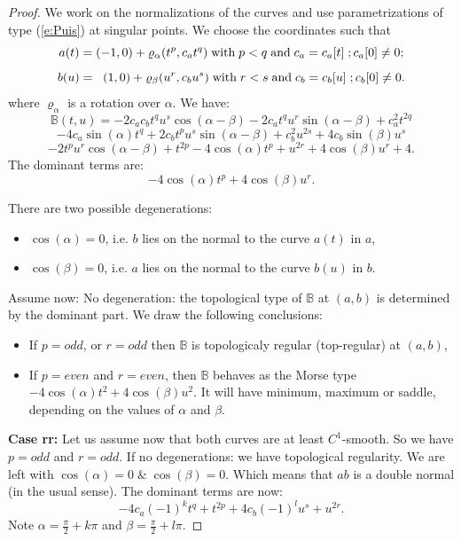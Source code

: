 \documentclass[10pt,a4paper]{amsart}
\begin{document}
\begin{proof}
We work on the normalizations of the curves and use parametrizations of type (\ref{e:Puis}) at singular points. 
We choose the coordinates such that
$$ a(t) = (-1,0) +\varrho_{\alpha}(t^p, c_a t^q)   \;  \mbox{\rm with} \;  p <q  \;  \mbox{\rm and}\;  c_a = c_a[t] \; ; c_a[0] \ne 0  ;$$
$$ b(u) =\;  \; (1,0) + \varrho_{\beta} (u^r, c_b u^s)  \;  \mbox{\rm with} \;  r <s  \;  \mbox{\rm and}\;  c_b = c_b[u]\; ; c_b[0] \ne 0. $$
where $\varrho_{\alpha}$ is a rotation over $\alpha$. We have:
$$\mathbb{B} (t,u) =
-2 c_a c_b t^q u^s \cos (\alpha -\beta )-2 c_a t^q u^r \sin (\alpha -\beta )+c_a^2 t^{2 q}$$ $$-4 c_a \sin (\alpha ) t^q +2 c_b t^p u^s \sin (\alpha -\beta )+c_b^2 u^{2 s}+4 c_b \sin (\beta ) u^s$$ $$ - 2 t^p u^r \cos (\alpha -\beta )+t^{2 p} -4 \cos (\alpha ) t^p +u^{2 r}+4 \cos (\beta ) u^r+4.
$$
The dominant terms are:
\begin{equation}\label{dominant}
-4 \cos (\alpha ) t^p +4 \cos (\beta ) u^r.
 \end{equation}


There are two possible degenerations:
\begin{itemize}
\item $\cos (\alpha )= 0$, i.e.  $b$ lies on the normal to the curve $a(t)$ in $a$,
\item $\cos (\beta) = 0$, i.e. $a$ lies on the normal to the curve $b(u)$ in $b$.
\end{itemize}


Assume now: No degeneration:  the topological type of $\mathbb{B}$  at $(a,b)$ is determined by the dominant part.
We draw the following conclusions:
\begin{itemize}
\item If $p = odd$, or $r= odd$ then $\mathbb{B}$ is topologicaly regular (top-regular) at $(a,b)$,
\item If $p = even$ and $r = even$,
 then $\mathbb{B}$ behaves as  the Morse type $ -4 \cos (\alpha ) t^2 +4 \cos (\beta ) u^2$.
 It will have minimum, maximum or saddle, depending on the values of $\alpha$ and $\beta$.
\end{itemize}

{\bf Case rr:} Let us assume now that both curves are at least $C^1$-smooth. So we have $p=odd$ and $r=odd$.
If no degenerations: we have topological regularity. We are left with $\cos (\alpha) = 0 \;  \&  \;\cos (\beta) = 0$.
Which means that $ab$ is a double normal (in the usual sense). The dominant terms are now:
\begin{equation}\label{rr-condition}
 -4 c_a (-1)^k t^q +t^{2 p} +4 c_b (-1)^l u^s+u^{2 r}.
 \end{equation}
Note $  \alpha = \frac{\pi}{2} + k \pi$ and $\beta = \frac{\pi}{2} + l \pi$. 


\end{proof}
\end{document}
